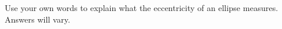 {Use your own words to explain what the eccentricity of an ellipse measures.
}
{Answers will vary.
}
